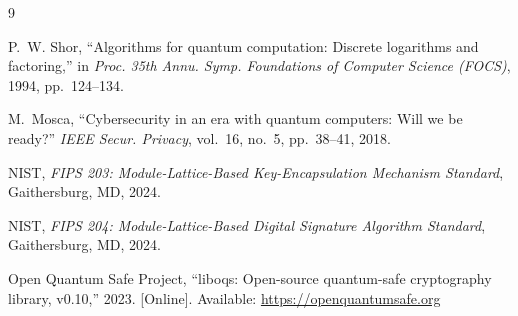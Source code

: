 \documentclass[conference]{IEEEtran}
\begin{document}
\begin{thebibliography}{9}

P.~W. Shor, ``Algorithms for quantum computation: Discrete logarithms and factoring,'' in \textit{Proc. 35th Annu. Symp. Foundations of Computer Science (FOCS)}, 1994, pp.~124--134.

M.~Mosca, ``Cybersecurity in an era with quantum computers: Will we be ready?'' \textit{IEEE Secur. Privacy}, vol.~16, no.~5, pp.~38--41, 2018.

NIST, \textit{FIPS 203: Module-Lattice-Based Key-Encapsulation Mechanism Standard}, Gaithersburg, MD, 2024.

NIST, \textit{FIPS 204: Module-Lattice-Based Digital Signature Algorithm Standard}, Gaithersburg, MD, 2024.

Open Quantum Safe Project, ``liboqs: Open-source quantum-safe cryptography library, v0.10,'' 2023. [Online]. Available: \url{https://openquantumsafe.org}

\end{thebibliography}
\end{document}
